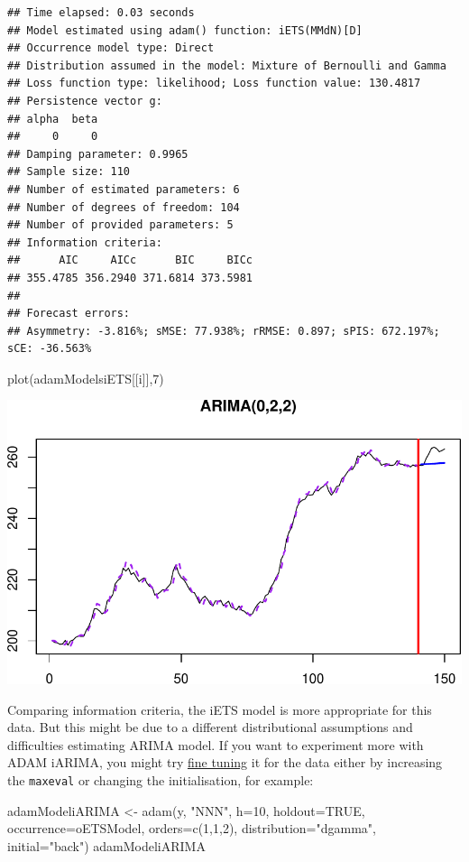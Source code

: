 \documentclass[
]{book}
\newenvironment{Shaded}{\begin{snugshade}}{\end{snugshade}}
\newcommand{\AttributeTok}[1]{\textcolor[rgb]{0.77,0.63,0.00}{#1}}
\newcommand{\ConstantTok}[1]{\textcolor[rgb]{0.00,0.00,0.00}{#1}}
\newcommand{\DecValTok}[1]{\textcolor[rgb]{0.00,0.00,0.81}{#1}}
\newcommand{\FunctionTok}[1]{\textcolor[rgb]{0.00,0.00,0.00}{#1}}
\newcommand{\NormalTok}[1]{#1}
\newcommand{\OtherTok}[1]{\textcolor[rgb]{0.56,0.35,0.01}{#1}}
\newcommand{\StringTok}[1]{\textcolor[rgb]{0.31,0.60,0.02}{#1}}
\theoremstyle{definition}
\theoremstyle{definition}
\theoremstyle{definition}
\theoremstyle{definition}
\theoremstyle{remark}
\begin{document}
\begin{verbatim}
## Time elapsed: 0.03 seconds
## Model estimated using adam() function: iETS(MMdN)[D]
## Occurrence model type: Direct
## Distribution assumed in the model: Mixture of Bernoulli and Gamma
## Loss function type: likelihood; Loss function value: 130.4817
## Persistence vector g:
## alpha  beta 
##     0     0 
## Damping parameter: 0.9965
## Sample size: 110
## Number of estimated parameters: 6
## Number of degrees of freedom: 104
## Number of provided parameters: 5
## Information criteria:
##      AIC     AICc      BIC     BICc 
## 355.4785 356.2940 371.6814 373.5981 
## 
## Forecast errors:
## Asymmetry: -3.816%; sMSE: 77.938%; rRMSE: 0.897; sPIS: 672.197%; sCE: -36.563%
\end{verbatim}

\begin{Shaded}
\begin{Highlighting}[]
\FunctionTok{plot}\NormalTok{(adamModelsiETS[[i]],}\DecValTok{7}\NormalTok{)}
\end{Highlighting}
\end{Shaded}

\includegraphics{adam_files/figure-latex/unnamed-chunk-120-1.pdf}

Comparing information criteria, the iETS model is more appropriate for this data. But this might be due to a different distributional assumptions and difficulties estimating ARIMA model. If you want to experiment more with ADAM iARIMA, you might try \protect\hyperlink{ADAMInitialisationOptAndBack}{fine tuning} it for the data either by increasing the \texttt{maxeval} or changing the initialisation, for example:

\begin{Shaded}
\begin{Highlighting}[]
\NormalTok{adamModeliARIMA }\OtherTok{\textless{}{-}} \FunctionTok{adam}\NormalTok{(y, }\StringTok{"NNN"}\NormalTok{, }\AttributeTok{h=}\DecValTok{10}\NormalTok{, }\AttributeTok{holdout=}\ConstantTok{TRUE}\NormalTok{,}
                        \AttributeTok{occurrence=}\NormalTok{oETSModel, }\AttributeTok{orders=}\FunctionTok{c}\NormalTok{(}\DecValTok{1}\NormalTok{,}\DecValTok{1}\NormalTok{,}\DecValTok{2}\NormalTok{),}
                        \AttributeTok{distribution=}\StringTok{"dgamma"}\NormalTok{, }\AttributeTok{initial=}\StringTok{"back"}\NormalTok{)}
\NormalTok{adamModeliARIMA}
\end{Highlighting}
\end{Shaded}
\end{document}

